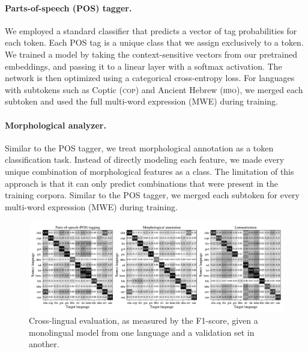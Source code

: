 \documentclass[11pt]{article}
\begin{document}
\paragraph{Parts-of-speech (POS) tagger.}
We employed a standard classifier that predicts a vector of tag probabilities for each token.
Each POS tag is a unique class that we assign exclusively to a token.
We trained a model by taking the context-sensitive vectors from our pretrained embeddings, and passing it to a linear layer with a softmax activation.
The network is then optimized using a categorical cross-entropy loss.
For languages with subtokens such as Coptic (\textsc{cop}) and Ancient Hebrew (\textsc{hbo}), we merged each subtoken and used the full multi-word expression (MWE) during training.

\paragraph{Morphological analyzer.}
Similar to the POS tagger, we treat morphological annotation as a token classification task.
Instead of directly modeling each feature, we made every unique combination of morphological features as a class.
The limitation of this approach is that it can only predict combinations that were present in the training corpora.
Similar to the POS tagger, we merged each subtoken for every multi-word expression (MWE) during training.

\begin{figure}[t]
  \centering
  \includegraphics[width=\textwidth]{figures/cross_lingual.pdf}
  \caption{Cross-lingual evaluation, as measured by the F1-score, given a monolingual model from one language and a validation set in another.}
  \label{fig:cross_lingual}
\end{figure}
\end{document}
